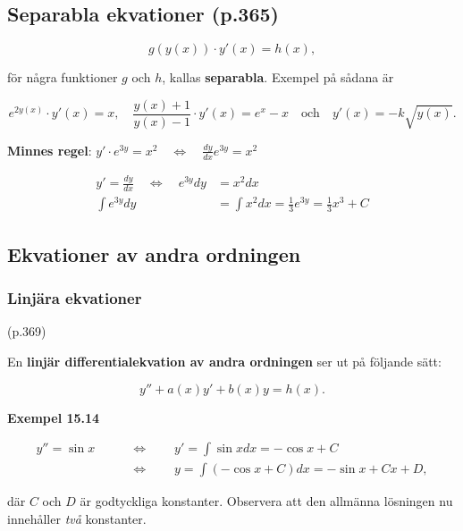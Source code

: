 \documentclass[11pt]{article}
\begin{document}
\subsection{Separabla ekvationer (p.365)}

\begin{equation}
    g(y(x)) \cdot y'(x) = h(x),
\end{equation}

för några funktioner $g$ och $h$, kallas \textbf{separabla}. Exempel på sådana är

\begin{equation}
    e^{2y(x)} \cdot y'(x) = x, \quad \frac{y(x) + 1}{y(x) - 1} \cdot y'(x) = e^x - x \quad \text{och} \quad y'(x) = -k\sqrt{y(x)}.
\end{equation}

\textbf{Minnes regel}: $y' \cdot e^{3y} = x^2 \quad \Leftrightarrow \quad \frac{dy}{dx}e^{3y} = x^2$

\begin{align}
    y' = \frac{dy}{dx} \quad \Leftrightarrow \quad e^{3y}dy &= x^2 dx\\
    \int e^{3y}dy &= \int x^2 dx = \frac{1}{3} e^{3y} = \frac{1}{3} x^3 + C
\end{align}

\subsection{Ekvationer av andra ordningen}

\subsubsection{Linjära ekvationer} (p.369)

En \textbf{linjär differentialekvation av andra ordningen} ser ut på följande sätt:

\begin{equation}
    y'' + a(x)y' + b(x)y = h(x).
\end{equation}

\textbf{Exempel 15.14}

\begin{align}
    y'' = \sin x \qquad &\Leftrightarrow \qquad  y' = \int \sin x dx = -\cos x + C\\
                 \qquad &\Leftrightarrow \qquad y = \int (-\cos x + C) dx = -\sin x + Cx + D,
\end{align}

där $C$ och $D$ är godtyckliga konstanter. Observera att den allmänna lösningen nu innehåller \textit{två} konstanter.
\end{document}
